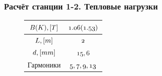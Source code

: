 \documentclass[14pt, hyperref = {colorlinks}]{beamer}
\begin{document}
\begin{frame}
\frametitle{Расчёт станции 1-2. Тепловые нагрузки}\label{t1}
\begin{figure}[h]
	\begin{minipage}[h]{0.49\linewidth}
		\tiny
		\vspace{-15pt}
		\begin{table}[h]
			\begin{tabular}{c|c}
				\hline\hline
				\rule{0pt}{3ex}$\mathnormal{B(K), [T]}$   & $\mathnormal{1.06(1.53)}$   \\ \hline
				\rule{0pt}{3ex}$\mathnormal{L, [m]}$ 	  & $\mathnormal{2}$          \\ \hline
				\rule{0pt}{3ex}$\mathnormal{d, [mm]}$     & $\mathnormal{15,6}$    		\\ \hline
				\rule{0pt}{3ex}Гармоники	              & $\mathnormal{5, 7, 9, 13}$  \\
				\hline\hline
			\end{tabular}
		\end{table}
		\vspace{-25pt}
		\tiny{}
	\end{minipage}
	\begin{minipage}[h]{0.49\linewidth}
		\vspace{-15pt}
		\vspace{-15pt}
		\tiny{}
	\end{minipage}
\end{figure}
\begin{figure}[h]
	\vspace{-30pt}
\end{figure}

\end{frame}
\end{document}
